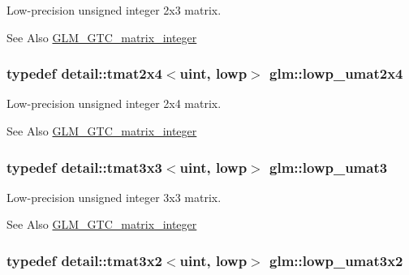 Low-\/precision unsigned integer 2x3 matrix. \begin{DoxySeeAlso}{See Also}
\hyperlink{group__gtc__matrix__integer}{G\-L\-M\-\_\-\-G\-T\-C\-\_\-matrix\-\_\-integer} 
\end{DoxySeeAlso}
\hypertarget{group__gtc__matrix__integer_ga581eef861234e918e88377fd331e37e6}{
\subsubsection[{lowp\-\_\-umat2x4}]{\setlength{\rightskip}{0pt plus 5cm}typedef detail\-::tmat2x4$<$uint, lowp$>$ {\bf glm\-::lowp\-\_\-umat2x4}}}\label{group__gtc__matrix__integer_ga581eef861234e918e88377fd331e37e6}
Low-\/precision unsigned integer 2x4 matrix. \begin{DoxySeeAlso}{See Also}
\hyperlink{group__gtc__matrix__integer}{G\-L\-M\-\_\-\-G\-T\-C\-\_\-matrix\-\_\-integer} 
\end{DoxySeeAlso}
\hypertarget{group__gtc__matrix__integer_ga7160c0ac500826224d3baf1003c0432c}{
\subsubsection[{lowp\-\_\-umat3}]{\setlength{\rightskip}{0pt plus 5cm}typedef detail\-::tmat3x3$<$uint, lowp$>$ {\bf glm\-::lowp\-\_\-umat3}}}\label{group__gtc__matrix__integer_ga7160c0ac500826224d3baf1003c0432c}
Low-\/precision unsigned integer 3x3 matrix. \begin{DoxySeeAlso}{See Also}
\hyperlink{group__gtc__matrix__integer}{G\-L\-M\-\_\-\-G\-T\-C\-\_\-matrix\-\_\-integer} 
\end{DoxySeeAlso}
\hypertarget{group__gtc__matrix__integer_ga5874e964b1816f230215df28d22ea7de}{
\subsubsection[{lowp\-\_\-umat3x2}]{\setlength{\rightskip}{0pt plus 5cm}typedef detail\-::tmat3x2$<$uint, lowp$>$ {\bf glm\-::lowp\-\_\-umat3x2}}}\label{group__gtc__matrix__integer_ga5874e964b1816f230215df28d22ea7de}
